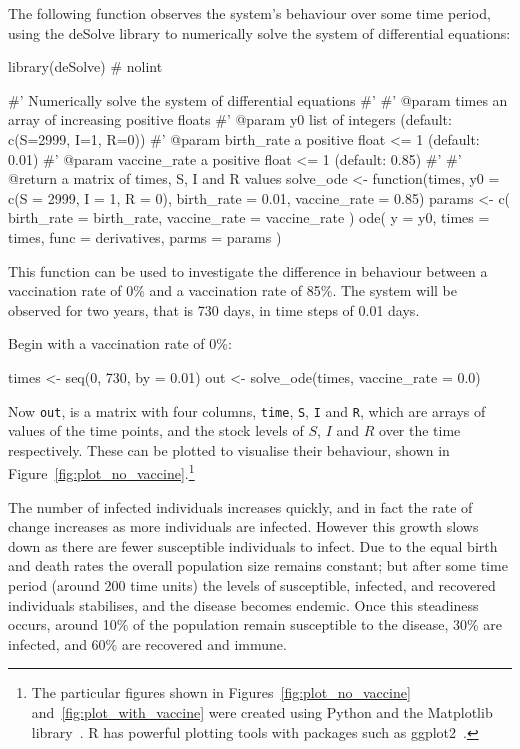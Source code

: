 The following function observes the system's behaviour over some time period,
using the deSolve library to numerically solve the system of
differential equations:

\begin{Rin}
library(deSolve)  # nolint

#' Numerically solve the system of differential equations
#'
#' @param times an array of increasing positive floats
#' @param y0 list of integers (default: c(S=2999, I=1, R=0))
#' @param birth_rate a positive float <= 1 (default: 0.01)
#' @param vaccine_rate a positive float <= 1 (default: 0.85)
#'
#' @return a matrix of times, S, I and R values
solve_ode <- function(times,
                      y0 = c(S = 2999, I = 1, R = 0),
                      birth_rate = 0.01,
                      vaccine_rate = 0.85){
  params <- c(
    birth_rate = birth_rate,
    vaccine_rate = vaccine_rate
  )
  ode(
    y = y0,
    times = times,
    func = derivatives,
    parms = params
  )
}
\end{Rin}

This function can be used to investigate the difference in behaviour between
a vaccination rate of 0\% and a vaccination rate of 85\%. The system will be
observed for two years, that is 730 days, in time steps of 0.01 days.

Begin with a vaccination rate of 0\%:

\begin{Rin}
times <- seq(0, 730, by = 0.01)
out <- solve_ode(times, vaccine_rate = 0.0)
\end{Rin}

Now \texttt{out}, is a matrix with four columns, \texttt{time},
\texttt{S}, \texttt{I} and \texttt{R}, which are arrays of
values of the time points, and the stock levels of $S$, $I$ and $R$ over the
time respectively.
These can be plotted to visualise their behaviour, shown in
Figure~\ref{fig:plot_no_vaccine}.\footnote{The particular figures shown in
Figures~\ref{fig:plot_no_vaccine} and~\ref{fig:plot_with_vaccine} were created
using Python and the Matplotlib
library~\cite{hunter2007matplotlib}. R has powerful plotting tools with packages
such as ggplot2~\cite{wickham2016ggplot2}.}

The number of infected individuals increases quickly, and in fact the rate of
change increases as more individuals are infected. However this growth slows
down as there are fewer susceptible individuals to infect. Due to the equal
birth and death rates the overall population size remains constant; but after
some time period (around 200 time units) the levels of susceptible,
infected, and recovered individuals stabilises, and the disease becomes endemic.
Once this steadiness occurs, around 10\% of the population remain susceptible to
the disease, 30\% are infected, and 60\% are recovered and immune.

